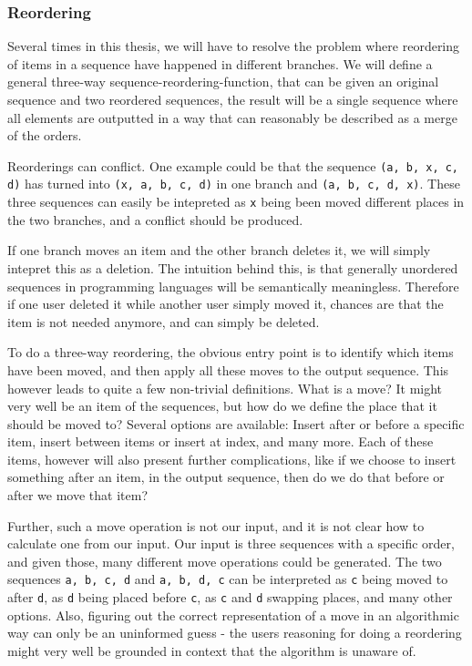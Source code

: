 \documentclass[11pt]{article}
\begin{document}
\subsubsection{Reordering}
Several times in this thesis, we will have to resolve the problem where reordering of items in a sequence have happened in different branches. We will define a general three-way sequence-reordering-function, that can be given an original sequence and two reordered sequences, the result will be a single sequence where all elements are outputted in a way that can reasonably be described as a merge of the orders.

Reorderings can conflict. One example could be that the sequence \texttt{(a, b, x, c, d)} has turned into \texttt{(x, a, b, c, d)} in one branch and \texttt{(a, b, c, d, x)}. These three sequences can easily be intepreted as \texttt{x} being been moved different places in the two branches, and a conflict should be produced.

If one branch moves an item and the other branch deletes it, we will simply intepret this as a deletion. The intuition behind this, is that generally unordered sequences in programming languages will be semantically meaningless. Therefore if one user deleted it while another user simply moved it, chances are that the item is not needed anymore, and can simply be deleted.

To do a three-way reordering, the obvious entry point is to identify which items have been moved, and then apply all these moves to the output sequence. This however leads to quite a few non-trivial definitions. What is a move? It might very well be an item of the sequences, but how do we define the place that it should be moved to? Several options are available: Insert after or before a specific item, insert between items or insert at index, and many more. Each of these items, however will also present further complications, like if we choose to insert something after an item, in the output sequence, then do we do that before or after we move that item?

Further, such a move operation is not our input, and it is not clear how to calculate one from our input. Our input is three sequences with a specific order, and given those, many different move operations could be generated. The two sequences \texttt{a, b, c, d} and \texttt{a, b, d, c} can be interpreted as \texttt{c} being moved to after \texttt{d}, as \texttt{d} being placed before \texttt{c}, as \texttt{c} and \texttt{d} swapping places, and many other options. Also, figuring out the correct representation of a move in an algorithmic way can only be an uninformed guess - the users reasoning for doing a reordering might very well be grounded in context that the algorithm is unaware of.
\end{document}
